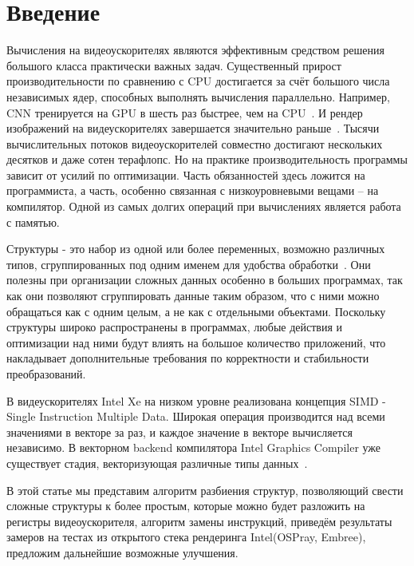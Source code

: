 \section{Введение}
\label{sec:Introduction}
Вычисления на видеоускорителях являются эффективным средством решения большого класса практически важных задач. 
Существенный прирост производительности по сравнению с CPU достигается за счёт большого числа независимых ядер, способных выполнять вычисления параллельно.
Например, CNN тренируется на GPU в шесть раз быстрее, чем на CPU~\cite{render}. И рендер изображений на видеускорителях завершается значительно раньше~\cite{render}.
Тысячи вычислительных потоков видеоускорителей совместно достигают нескольких десятков и даже сотен терафлопс. Но на практике производительность программы зависит от усилий по оптимизации.
Часть обязанностей здесь ложится на программиста, а часть, особенно связанная с низкоуровневыми вещами -- на компилятор.
Одной из самых долгих операций при вычислениях является работа с памятью. 

Структуры - это набор из одной или более переменных, возможно различных типов, сгруппированных под одним именем для удобства обработки~\cite{Kern}.
Они полезны при организации сложных данных особенно в больших программах, так как они позволяют сгруппировать данные таким образом, что с ними можно обращаться как с одним целым, а не как с отдельными объектами.
Поскольку структуры широко распространены в программах, любые действия и оптимизации над ними будут влиять на большое количество приложений, что накладывает дополнительные требования по корректности и стабильности преобразований.

В видеускорителях Intel Xe на низком уровне реализована концепция SIMD - Single Instruction Multiple Data.
Широкая операция производится над всеми значениями в векторе за раз, и каждое значение в векторе вычисляется независимо.
В векторном backend компилятора Intel Graphics Compiler уже существует стадия, векторизующая различные типы данных~\cite{KEN}.

В этой статье мы представим алгоритм разбиения структур, позволяющий свести сложные структуры к более простым, которые можно будет разложить на регистры видеоускорителя, алгоритм замены инструкций, приведём результаты замеров на тестах из открытого стека рендеринга Intel(OSPray, Embree), предложим дальнейшие возможные улучшения.